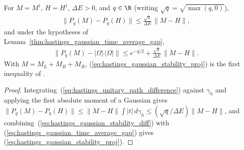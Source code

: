 \begin{lemma}
    \label{thm:hastings_gaussian_time_average_stability}
    \leanok
    For $M=M^\dagger$, $H=H^\dagger$, $\Delta E>0$, and $q\in\R$ (writing
    $\sqrt q=\sqrt{\max(q,0)}$),
    \begin{align}
        \|P_q(M)-P_q(H)\|\le\frac{\sqrt q}{\Delta E}\,\|M-H\|,
        \label{eq:hastings_gaussian_stability_diff}
    \end{align}
    and under the hypotheses of Lemma~\ref{thm:hastings_gaussian_time_average_gap},
    \begin{align}
        \bigl\|P_q(M)-|\Omega\rangle\langle\Omega|\bigr\|
        \le e^{-q/2}+\frac{\sqrt q}{\Delta E}\,\|M-H\|.
        \label{eq:hastings_gaussian_stability_proj}
    \end{align}
    With $M=M_L+M_B+M_R$, (\ref{eq:hastings_gaussian_stability_proj}) is the
    first inequality of \cite[lines 849--864]{Hastings2007AreaLaw}.
\end{lemma}
\begin{proof}\leanok
    Integrating~(\ref{eq:hastings_unitary_path_difference}) against $\gamma_h$
    and applying the first absolute moment of a Gaussian
    \cite[``First absolute moment of a Gaussian'']{QICLean2026Blueprint} gives
    $\|P_q(M)-P_q(H)\|\le\|M-H\|\int|t|\,d\gamma_h\le(\sqrt q/\Delta E)\|M-H\|$,
    and combining~(\ref{eq:hastings_gaussian_stability_diff}) with
    (\ref{eq:hastings_gaussian_time_average_gap}) gives
    (\ref{eq:hastings_gaussian_stability_proj}).
\end{proof}
